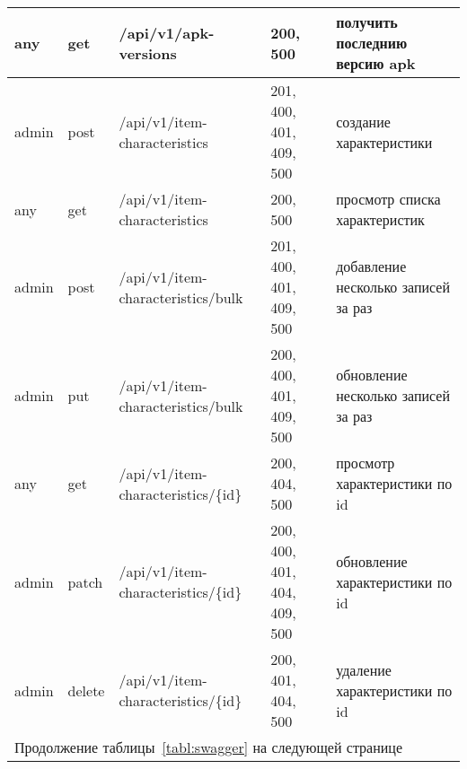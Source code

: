 \begin{sidewaystable}
\begin{tabular}{|p{1cm}|p{1cm}|p{8.5cm}|p{4.8cm}|p{8cm}|}
        any & get & /api/v1/apk-versions & 200, 500 & получить последнию версию apk \\ \hline 
        admin & post & /api/v1/item-characteristics & 201, 400, 401, 409, 500 & создание характеристики \\ \hline 
        any & get & /api/v1/item-characteristics & 200, 500 & просмотр списка характеристик \\ \hline 
        admin & post & /api/v1/item-characteristics/bulk & 201, 400, 401, 409, 500 & добавление несколько записей за раз \\ \hline 
        admin & put & /api/v1/item-characteristics/bulk & 200, 400, 401, 409, 500 & обновление несколько записей за раз \\ \hline 
        any & get & /api/v1/item-characteristics/\{id\} & 200, 404, 500 & просмотр характеристики по id \\ \hline 
        admin & patch & /api/v1/item-characteristics/\{id\} & 200, 400, 401, 404, 409, 500 & обновление характеристики по id \\ \hline 
        admin & delete & /api/v1/item-characteristics/\{id\} & 200, 401, 404, 500 & удаление характеристики по id \\ \hline 
        \multicolumn{5}{l}{Продолжение таблицы~\ref{tabl:swagger} на следующей странице} \\
    \end{tabular}
\end{sidewaystable}
